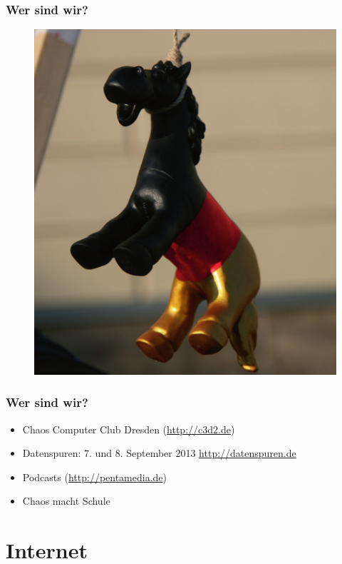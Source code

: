 \documentclass[12pt]{beamer}
\begin{document}
\begin{frame}
  \frametitle{Wer sind wir?}
  \begin{figure}
    \includegraphics[height=0.7\textheight]{img/trojaner.jpg}
  \end{figure}
\end{frame}

\begin{frame}
    \frametitle{Wer sind wir?}
    \begin{itemize}
      \item<1-> Chaos Computer Club Dresden (\url{http://c3d2.de})
          \note{}
      \item<2-> Datenspuren: 7. und 8. September 2013 \url{http://datenspuren.de}
      \item<3-> Podcasts (\url{http://pentamedia.de})
      \item<4-> Chaos macht Schule
    \end{itemize}
\end{frame}

\section{Internet}
\end{document}
